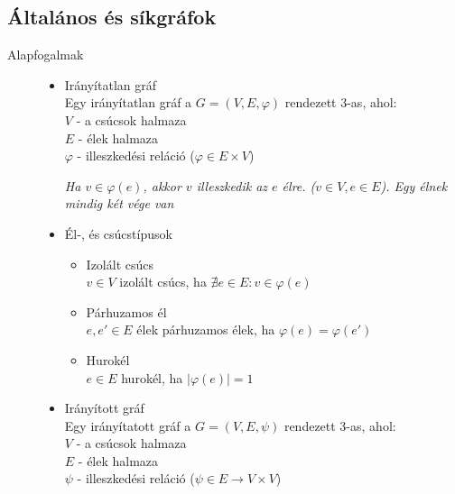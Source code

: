\documentclass[margin=0px]{article}
\begin{document}
		\subsection{Általános és síkgráfok}
			\begin{description}
				\item[Alapfogalmak] \hfill
					\begin{itemize}
						\item Irányítatlan gráf\\
							Egy irányítatlan gráf a $G = (V,E, \varphi)$ rendezett 3-as, ahol:\\
							$V$ - a csúcsok halmaza \\
							$E$ - élek halmaza \\
							$\varphi$ - illeszkedési reláció ($\varphi \in E \times V$)
							
							\textit{Ha $v\in\varphi(e)$, akkor $v$ illeszkedik az $e$ élre. ($v\in V, e\in E$). Egy élnek mindig két vége van}
							
						\item Él-, és csúcstípusok
							\begin{itemize}
								\item Izolált csúcs \\
								$v\in V$ izolált csúcs, ha $\nexists e \in E: v\in \varphi(e)$
								\item Párhuzamos él \\
								$e,e'\in E$ élek párhuzamos élek, ha $\varphi(e) = \varphi(e')$
								\item Hurokél \\
									$e\in E$ hurokél, ha $|\varphi(e) | = 1$
							\end{itemize}
						\item Irányított gráf \\
							Egy irányítatott gráf a $G = (V,E, \psi)$ rendezett 3-as, ahol:\\
							$V$ - a csúcsok halmaza \\
							$E$ - élek halmaza \\
							$\psi$ - illeszkedési reláció ($\psi \in E \rightarrow V \times V$)
							

\end{itemize}
\end{description}
\end{document}
